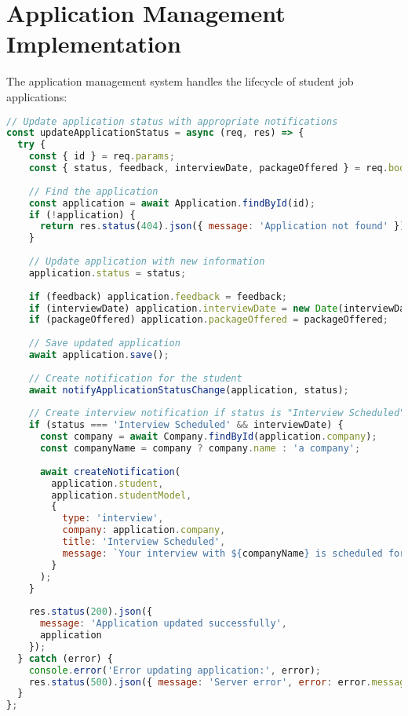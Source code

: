 \documentclass[12pt,a4paper]{report}
\begin{document}
\section{Application Management Implementation}
The application management system handles the lifecycle of student job applications:

\begin{lstlisting}[language=JavaScript, caption=Application Status Update Function]
// Update application status with appropriate notifications
const updateApplicationStatus = async (req, res) => {
  try {
    const { id } = req.params;
    const { status, feedback, interviewDate, packageOffered } = req.body;
    
    // Find the application
    const application = await Application.findById(id);
    if (!application) {
      return res.status(404).json({ message: 'Application not found' });
    }
    
    // Update application with new information
    application.status = status;
    
    if (feedback) application.feedback = feedback;
    if (interviewDate) application.interviewDate = new Date(interviewDate);
    if (packageOffered) application.packageOffered = packageOffered;
    
    // Save updated application
    await application.save();
    
    // Create notification for the student
    await notifyApplicationStatusChange(application, status);
    
    // Create interview notification if status is "Interview Scheduled"
    if (status === 'Interview Scheduled' && interviewDate) {
      const company = await Company.findById(application.company);
      const companyName = company ? company.name : 'a company';
      
      await createNotification(
        application.student, 
        application.studentModel,
        {
          type: 'interview',
          company: application.company,
          title: 'Interview Scheduled',
          message: `Your interview with ${companyName} is scheduled for ${new Date(interviewDate).toLocaleString()}`,
        }
      );
    }
    
    res.status(200).json({ 
      message: 'Application updated successfully',
      application
    });
  } catch (error) {
    console.error('Error updating application:', error);
    res.status(500).json({ message: 'Server error', error: error.message });
  }
};
\end{lstlisting}
\end{document}
